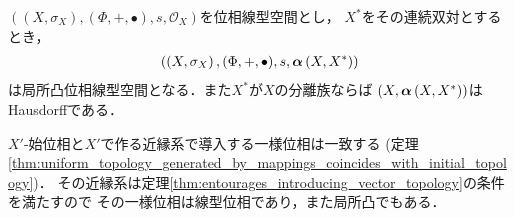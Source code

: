 	\begin{screen}
		\begin{thm}[弱位相は局所凸]
			$\left((X,\sigma_X),(\Phi,+,\bullet),s,\mathscr{O}_X\right)$を位相線型空間とし，
			$X^*$をその連続双対とするとき，
			\begin{align}
				\left(\left(X,\sigma_X\right),(\Phi,+,\bullet),s,{\boldsymbol \alpha} \left(X,X^*\right)\right)
			\end{align}
			は局所凸位相線型空間となる．また$X^*$が$X$の分離族ならば
			$\left(X,{\boldsymbol \alpha} \left(X,X^*\right)\right)$はHausdorffである．
		\end{thm}
	\end{screen}
	
	\begin{sketch}
		$X'$-始位相と$X'$で作る近縁系で導入する一様位相は一致する
		(定理\ref{thm:uniform_topology_generated_by_mappings_coincides_with_initial_topology})．
		その近縁系は定理\ref{thm:entourages_introducing_vector_topology}の条件を満たすので
		その一様位相は線型位相であり，また局所凸でもある．
	\end{sketch}